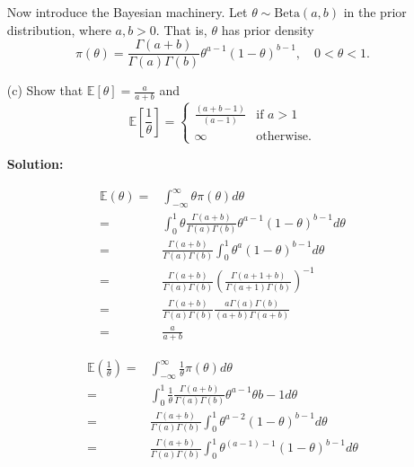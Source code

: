 \documentclass{article}
\begin{document}
\begin{enumerate}
    Now introduce the Bayesian machinery. Let $\theta \sim \text{Beta}(a,b)$ in the prior distribution, where $a, b > 0$. That is, $\theta$ has prior density
    \[
    \pi(\theta) = \frac{\Gamma(a+b)}{\Gamma(a)\Gamma(b)} \theta^{a-1}(1-\theta)^{b-1}, \quad 0 < \theta < 1.
    \]
    
    \item[(c)] Show that $\mathbb{E}[\theta] = \frac{a}{a+b}$ and
    \[
    \mathbb{E}\left[\frac{1}{\theta}\right] = 
    \begin{cases} 
    \frac{(a+b-1)}{(a-1)} & \text{if } a > 1 \\
    \infty & \text{otherwise.}
    \end{cases}
    \]

    \textbf{Solution:}
    \par

    \begin{align*}
    \mathbb{E}(\theta) =& \int_{-\infty}^{\infty} \theta \pi(\theta) d \theta\\
                        =& \int_0^1 \theta \frac{\Gamma(a + b)}{\Gamma(a)  \Gamma(b)} \theta^{a-1} (1 - \theta)^{b-1} d \theta\\
                        =& \frac{\Gamma(a + b)}{\Gamma(a)   \Gamma(b)} \int_0^1 \theta^{a}(1-\theta)^{b-1} d \theta\\
                        =&  \frac{\Gamma(a + b)}{\Gamma(a)   \Gamma(b)} \left(  \frac{\Gamma(a +1  + b)}{\Gamma(a + 1) \Gamma(b)}\right)^{-1}\\
                        =& \frac{\Gamma(a + b)}{\Gamma(a)  \Gamma(b)} \frac{a\Gamma(a) \Gamma(b)}{(a+b) \Gamma(a+b)}\\
                        =& \frac{a}{a+b}
    \end{align*}

    \begin{align*}
        \mathbb{E}\left(\frac{1}{\theta}\right) =& \int_{-\infty}^{\infty} \frac{1}{\theta} \pi(\theta) d \theta\\
                    =& \int_0^1 \frac{1}{\theta} \frac{\Gamma(a + b)}{\Gamma(a)  \Gamma(b)} \theta^{a-1} \theta{b-1} d \theta\\
                    =& \frac{\Gamma(a + b)}{\Gamma(a) \Gamma(b)} \int_0^1 \theta^{a-2}(1-\theta)^{b-1} d \theta\\
                    =& \frac{\Gamma(a + b)}{\Gamma(a) \Gamma(b)} \int_0^1 \theta^{(a-1)-1}(1-\theta)^{b-1} d \theta
    \end{align*}


\end{enumerate}
\end{document}
